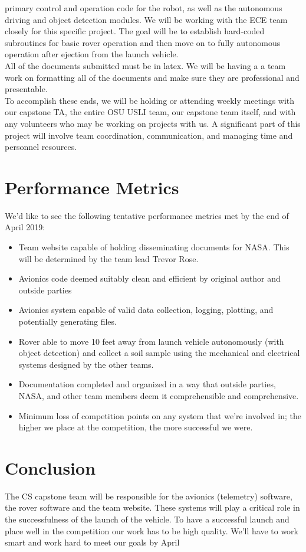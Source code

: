 \documentclass{IEEEtran}  %
\begin{document}
primary control and operation code for the robot, as well
as the autonomous driving and object detection modules.
We will be working with the ECE team closely for this
specific project. The goal will be to establish hard-coded
subroutines for basic rover operation and then move on to
fully autonomous operation after ejection from the launch
vehicle.
\newline
\\All of the documents submitted must be in latex. We will be having a a team work on formatting all of the documents and make sure they are professional and presentable. 
\newline
\\To accomplish these ends, we will be holding or attending
weekly meetings with our capstone TA, the entire OSU USLI
team, our capstone team itself, and with any volunteers who
may be working on projects with us. A significant part of this project will involve
team coordination, communication, and managing time and
personnel resources.

\section{Performance Metrics}
\noindent We'd like to see the following tentative performance metrics met by the end of April 2019:
\begin{itemize}
    \item Team website capable of holding disseminating documents for NASA. This will be determined by the team lead Trevor Rose.
    \item Avionics code deemed suitably clean and efficient by original author and outside parties
    \item Avionics system capable of valid data collection, logging, plotting, and potentially generating files.
    \item Rover able to move 10 feet away from launch vehicle autonomously (with object detection) and collect a soil sample using the mechanical and electrical systems designed by the other teams.
    \item Documentation completed and organized in a way that outside parties, NASA, and other team members deem it comprehensible and comprehensive.
    \item Minimum loss of competition points on any system that we’re involved in; the higher we place at the competition, the more successful we were.
\end{itemize}

\section{Conclusion}
\noindent The CS capstone team will be responsible for the avionics (telemetry) software, the rover software and the team website. These systems will play a critical role in the successfulness of the launch of the vehicle. To have a successful launch and place well in the competition our work has to be high quality. We'll have to work smart and work hard to meet our goals by April
\end{document}

